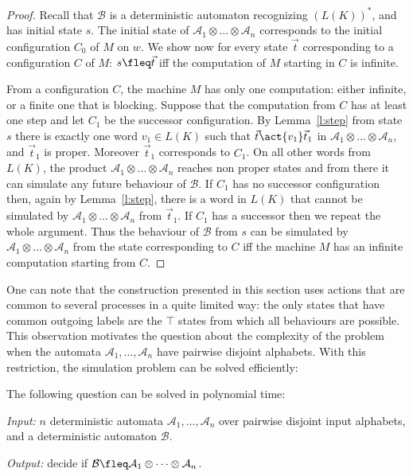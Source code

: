 \documentclass{LMCS}
\theoremstyle{plain}\newtheorem{remark}{Remark}
\theoremstyle{plain}\newtheorem{lemma}[thm]{Lemma}
\renewcommand{\Aa}{\mathcal{A}}
\renewcommand{\Bb}{\mathcal{B}}
\newcommand{\vect}{\vec t}
\newcommand{\vAa}{\Aa_1\otimes\dots\otimes\Aa_n}
\begin{document}
\begin{proof}
  Recall that $\Bb$ is a deterministic automaton recognizing
  $(L(K))^*$, and has initial state $s$.  
The initial state of $\vAa$ corresponds to the initial
  configuration $C_0$ of $M$ on $w$. We show now for every state 
$\vect$ corresponding to a configuration $C$ of $M$:  $s \fleq \vect$ iff the 
computation of $M$ starting in $C$ is infinite.

From a configuration $C$, the machine $M$ has only one computation: either
infinite, or a finite one that is blocking. Suppose that the computation
from $C$ has at least one step and let $C_1$ be the successor
configuration. By Lemma~\ref{l:step} from state $s$ there is exactly
one word $v_1\in L(K)$ such that $\vect \act{v_1} \vect_1$ in $\vAa$,
and $\vect_1$ is proper.  Moreover $\vect_1$
corresponds to $C_1$. On all other words from $L(K)$, the product
$\vAa$ reaches non proper states and from there it can simulate any
future behaviour of $\Bb$.  If $C_1$ has no successor configuration
then, again by Lemma~\ref{l:step}, there is a word in $L(K)$ that
cannot be simulated by $\vAa$ from $\vect_1$. If $C_1$ has a successor
then we repeat the whole argument. Thus the behaviour of $\Bb$ from $s$
can be simulated by $\vAa$ from the state corresponding to $C$
iff the machine $M$ has an infinite computation starting from $C$.

\end{proof}

\medskip

One can note that the construction presented in this section uses
actions that are common to several processes in a quite limited way:
the only states that have common outgoing labels are the $\top$ states
from which all behaviours are possible. This observation motivates the
question about the complexity of the problem when the
automata $\Aa_1,\dots,\Aa_n$ have pairwise disjoint alphabets. With
this restriction, the simulation problem can be solved efficiently:

\begin{thm}
The following question can be solved in polynomial time:

\emph{Input:} $n$ deterministic automata
$\Aa_1,\dots,\Aa_n$ over pairwise disjoint input alphabets, 
and a deterministic automaton $\Bb$.

\emph{Output:} decide if
$\Bb \fleq \Aa_1\otimes\dots\otimes\Aa_n$.
\end{thm}
\end{document}
